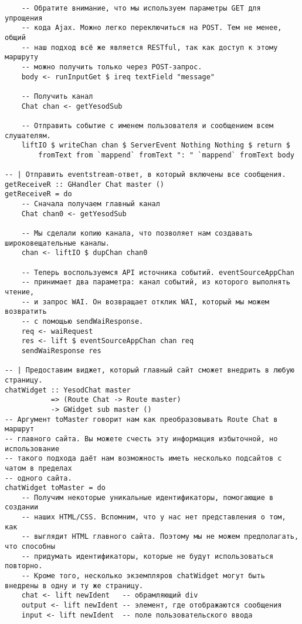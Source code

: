 \begin{lstlisting}
    -- Обратите внимание, что мы используем параметры GET для упрощения
    -- кода Ajax. Можно легко переключиться на POST. Тем не менее, общий
    -- наш подход всё же является RESTful, так как доступ к этому маршруту
    -- можно получить только через POST-запрос.
    body <- runInputGet $ ireq textField "message"

    -- Получить канал
    Chat chan <- getYesodSub

    -- Отправить событие с именем пользователя и сообщением всем слушателям.
    liftIO $ writeChan chan $ ServerEvent Nothing Nothing $ return $
        fromText from `mappend` fromText ": " `mappend` fromText body

-- | Отправить eventstream-ответ, в который включены все сообщения.
getReceiveR :: GHandler Chat master ()
getReceiveR = do
    -- Сначала получаем главный канал
    Chat chan0 <- getYesodSub

    -- Мы сделали копию канала, что позволяет нам создавать широковещательные каналы.
    chan <- liftIO $ dupChan chan0

    -- Теперь воспользуемся API источника событий. eventSourceAppChan
    -- принимает два параметра: канал событий, из которого выполнять чтение,
    -- и запрос WAI. Он возвращает отклик WAI, который мы можем возвратить
    -- с помощью sendWaiResponse.
    req <- waiRequest
    res <- lift $ eventSourceAppChan chan req
    sendWaiResponse res

-- | Предоставим виджет, который главный сайт сможет внедрить в любую страницу.
chatWidget :: YesodChat master
           => (Route Chat -> Route master)
           -> GWidget sub master ()
-- Аргумент toMaster говорит нам как преобразовывать Route Chat в маршрут
-- главного сайта. Вы можете счесть эту информация избыточной, но использование
-- такого подхода даёт нам возможность иметь несколько подсайтов с чатом в пределах
-- одного сайта.
chatWidget toMaster = do
    -- Получим некоторые уникальные идентификаторы, помогающие в создании
    -- наших HTML/CSS. Вспомним, что у нас нет представления о том, как
    -- выглядит HTML главного сайта. Поэтому мы не можем предполагать, что способны
    -- придумать идентификаторы, которые не будут использоваться повторно.
    -- Кроме того, несколько экземпляров chatWidget могут быть внедрены в одну и ту же страницу.
    chat <- lift newIdent   -- обрамляющий div
    output <- lift newIdent -- элемент, где отображаются сообщения
    input <- lift newIdent  -- поле пользовательского ввода


\end{lstlisting}
